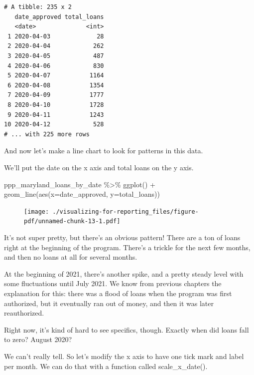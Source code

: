 \documentclass[
  letterpaper,
  DIV=11,
  numbers=noendperiod]{scrreprt}
\newenvironment{Shaded}{\begin{snugshade}}{\end{snugshade}}
\newcommand{\AttributeTok}[1]{\textcolor[rgb]{0.40,0.45,0.13}{#1}}
\newcommand{\FunctionTok}[1]{\textcolor[rgb]{0.28,0.35,0.67}{#1}}
\newcommand{\NormalTok}[1]{\textcolor[rgb]{0.00,0.23,0.31}{#1}}
\newcommand{\SpecialCharTok}[1]{\textcolor[rgb]{0.37,0.37,0.37}{#1}}
\begin{document}
\begin{verbatim}
# A tibble: 235 x 2
   date_approved total_loans
   <date>              <int>
 1 2020-04-03             28
 2 2020-04-04            262
 3 2020-04-05            487
 4 2020-04-06            830
 5 2020-04-07           1164
 6 2020-04-08           1354
 7 2020-04-09           1777
 8 2020-04-10           1728
 9 2020-04-11           1243
10 2020-04-12            528
# ... with 225 more rows
\end{verbatim}

And now let's make a line chart to look for patterns in this data.

We'll put the date on the x axis and total loans on the y axis.

\begin{Shaded}
\begin{Highlighting}[]
\NormalTok{ppp\_maryland\_loans\_by\_date }\SpecialCharTok{\%\textgreater{}\%}
  \FunctionTok{ggplot}\NormalTok{() }\SpecialCharTok{+} 
  \FunctionTok{geom\_line}\NormalTok{(}\FunctionTok{aes}\NormalTok{(}\AttributeTok{x=}\NormalTok{date\_approved, }\AttributeTok{y=}\NormalTok{total\_loans))}
\end{Highlighting}
\end{Shaded}

\begin{figure}[H]

{\centering \texttt{[image: ./visualizing-for-reporting\_files/figure-pdf/unnamed-chunk-13-1.pdf]}

}

\end{figure}

It's not super pretty, but there's an obvious pattern! There are a ton
of loans right at the beginning of the program. There's a trickle for
the next few months, and then no loans at all for several months.

At the beginning of 2021, there's another spike, and a pretty steady
level with some fluctuations until July 2021. We know from previous
chapters the explanation for this: there was a flood of loans when the
program was first authorized, but it eventually ran out of money, and
then it was later reauthorized.

Right now, it's kind of hard to see specifics, though. Exactly when did
loans fall to zero? August 2020?

We can't really tell. So let's modify the x axis to have one tick mark
and label per month. We can do that with a function called
scale\_x\_date().
\end{document}
